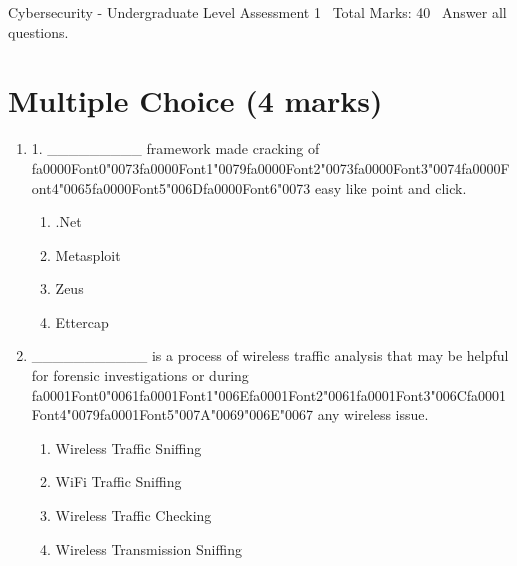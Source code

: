 \documentclass[12pt]{article}
\begin{document}
\begin{center}
Cybersecurity - Undergraduate Level Assessment 1 \
Total Marks: 40 \
Answer all questions.
\end{center}

\section*{Multiple Choice (4 marks)}
\begin{enumerate}[label=\arabic*.]
\item 1. \_\_\_\_\_\_\_\_\_ framework made cracking of {\csname fa0000Font0\endcsname\char"0073}{\csname fa0000Font1\endcsname\char"0079}{\csname fa0000Font2\endcsname\char"0073}{\csname fa0000Font3\endcsname\char"0074}{\csname fa0000Font4\endcsname\char"0065}{\csname fa0000Font5\endcsname\char"006D}{\csname fa0000Font6\endcsname\char"0073} easy like point and click.
\begin{enumerate}[label=(\alph*)]
    \item .Net
    \item Metasploit
    \item Zeus
    \item Ettercap
\end{enumerate}
\item \_\_\_\_\_\_\_\_\_\_\_ is a process of wireless traffic analysis that may be helpful for forensic investigations or during {\csname fa0001Font0\endcsname\char"0061}{\csname fa0001Font1\endcsname\char"006E}{\csname fa0001Font2\endcsname\char"0061}{\csname fa0001Font3\endcsname\char"006C}{\csname fa0001Font4\endcsname\char"0079}{\csname fa0001Font5\endcsname\char"007A}{\char"0069}{\char"006E}{\char"0067} any wireless issue.
\begin{enumerate}[label=(\alph*)]
    \item Wireless Traffic Sniffing
    \item WiFi Traffic Sniffing
    \item Wireless Traffic Checking
    \item Wireless Transmission Sniffing
\end{enumerate}
\end{enumerate}
\end{document}
